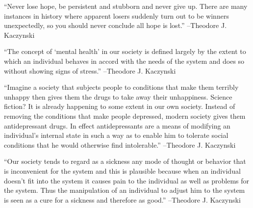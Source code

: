 \documentclass{article}%
\begin{document}
\begin{minipage}{\textwidth}%
\flushleft%
“Never lose hope, be persistent and stubborn and never give up. There are many instances in history where apparent losers suddenly turn out to be winners unexpectedly, so you should never conclude all hope is lost.”%
\linebreak%
\vspace{1mm}%
–Theodore J. Kaczynski%
\linebreak%
\vspace{1mm}%
\end{minipage}%
\linebreak%
\vspace{1mm}%
\begin{minipage}{\textwidth}%
\flushleft%
“The concept of ‘mental health’ in our society is defined largely by the extent to which an individual behaves in accord with the needs of the system and does so without showing signs of stress.”%
\linebreak%
\vspace{1mm}%
–Theodore J. Kaczynski%
\linebreak%
\vspace{1mm}%
\end{minipage}%
\linebreak%
\vspace{1mm}%
\begin{minipage}{\textwidth}%
\flushleft%
“Imagine a society that subjects people to conditions that make them terribly unhappy then gives them the drugs to take away their unhappiness. Science fiction? It is already happening to some extent in our own society. Instead of removing the conditions that make people depressed, modern society gives them antidepressant drugs. In effect antidepressants are a means of modifying an individual's internal state in such a way as to enable him to tolerate social conditions that he would otherwise find intolerable.”%
\linebreak%
\vspace{1mm}%
–Theodore J. Kaczynski%
\linebreak%
\vspace{1mm}%
\end{minipage}%
\linebreak%
\vspace{1mm}%
\begin{minipage}{\textwidth}%
\flushleft%
“Our society tends to regard as a sickness any mode of thought or behavior that is inconvenient for the system and this is plausible because when an individual doesn't fit into the system it causes pain to the individual as well as problems for the system. Thus the manipulation of an individual to adjust him to the system is seen as a cure for a sickness and therefore as good.”%
\linebreak%
\vspace{1mm}%
–Theodore J. Kaczynski%
\linebreak%
\vspace{1mm}%
\end{minipage}%
\end{document}
